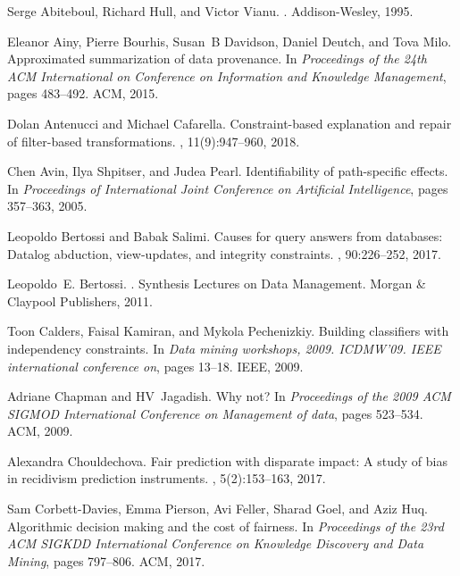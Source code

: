 
Serge Abiteboul, Richard Hull, and Victor Vianu.
.
\newblock Addison-Wesley, 1995.

Eleanor Ainy, Pierre Bourhis, Susan~B Davidson, Daniel Deutch, and Tova Milo.
\newblock Approximated summarization of data provenance.
\newblock In {\em Proceedings of the 24th ACM International on Conference on
  Information and Knowledge Management}, pages 483--492. ACM, 2015.

Dolan Antenucci and Michael Cafarella.
\newblock Constraint-based explanation and repair of filter-based
  transformations.
, 11(9):947--960, 2018.

Chen Avin, Ilya Shpitser, and Judea Pearl.
\newblock Identifiability of path-specific effects.
\newblock In {\em Proceedings of International Joint Conference on Artificial
  Intelligence}, pages 357--363, 2005.

Leopoldo Bertossi and Babak Salimi.
\newblock Causes for query answers from databases: Datalog abduction,
  view-updates, and integrity constraints.
, 90:226--252,
  2017.

Leopoldo~E. Bertossi.
.
\newblock Synthesis Lectures on Data Management. Morgan {\&} Claypool
  Publishers, 2011.

Toon Calders, Faisal Kamiran, and Mykola Pechenizkiy.
\newblock Building classifiers with independency constraints.
\newblock In {\em Data mining workshops, 2009. ICDMW'09. IEEE international
  conference on}, pages 13--18. IEEE, 2009.

Adriane Chapman and HV~Jagadish.
\newblock Why not?
\newblock In {\em Proceedings of the 2009 ACM SIGMOD International Conference
  on Management of data}, pages 523--534. ACM, 2009.

Alexandra Chouldechova.
\newblock Fair prediction with disparate impact: A study of bias in recidivism
  prediction instruments.
, 5(2):153--163, 2017.

Sam Corbett-Davies, Emma Pierson, Avi Feller, Sharad Goel, and Aziz Huq.
\newblock Algorithmic decision making and the cost of fairness.
\newblock In {\em Proceedings of the 23rd ACM SIGKDD International Conference
  on Knowledge Discovery and Data Mining}, pages 797--806. ACM, 2017.

